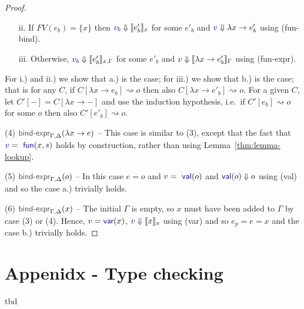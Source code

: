 \documentclass[acmsmall,anonymous,fleqn]{acmart}\settopmatter{printfolios=false,printccs=false,printacmref=false}
\theoremstyle{plain}
\theoremstyle{definition}
\newcommand{\ident}[1]{\textnormal{\textcolor{idclr}{\sffamily #1}}}
\newcommand{\bndclr}[1]{\textcolor{kvdclr}{#1}}
\newcommand{\bnd}[1]{\textnormal{\textcolor{kvdclr}{\sffamily #1}}}
\newcommand{\rname}[1]{{\sffamily\small(#1)}}
\begin{document}
\begin{proof}
\begin{enumerate}
  \item[ii.]
  If $FV(e_b)=\{x\}$ then $\bndclr{v_b}\Downarrow \llbracket e'_b \rrbracket_x$ for some $e'_b$ and
  $\bndclr{v}\Downarrow \lambda x\rightarrow e'_b$ using \rname{fun-bind}.

  \item[iii.]
  Otherwise, $\bndclr{v_b}\Downarrow \llbracket e'_b \rrbracket_{x,\Gamma}$ for some $e'_b$ and
  $\bndclr{v}\Downarrow \llbracket\lambda x\rightarrow e'_b\rrbracket_\Gamma$ using \rname{fun-expr}.
  \end{enumerate}

\noindent
For i.) and ii.) we show that a.) is the case; for iii.) we show that b.) is the case; that is
for any $C$, if $C[\lambda x\rightarrow e_b] \rightsquigarrow o$ then also
$C[\lambda x\rightarrow e'_b] \rightsquigarrow o$. For a given $C$, let $C'[-] = C[\lambda x\rightarrow -]$
and use the induction hypothesis, i.e.~if $C'[e_b] \rightsquigarrow o$ for some $o$ then also $C'[e'_b] \rightsquigarrow o$.

\vspace{0.75em}\noindent(4) $\ident{bind-expr}_{\Gamma, \Delta}(\lambda x\rightarrow e)$  --
  This case is similar to (3), except that the fact that $\bndclr{v} = \bnd{fun}(x, s)$
  holds by construction, rather than using Lemma~\ref{thm:lemma-lookup}.

\vspace{0.75em}\noindent(5) $\ident{bind-expr}_{\Gamma, \Delta}(o)$ -- In this case $e=o$ and $\bndclr{v} = \bnd{val}(o)$
  and $\bnd{val}(o)\Downarrow o$ using \rname{val} and so the case a.) trivially holds.

\vspace{0.75em}\noindent(6) $\ident{bind-expr}_{\Gamma, \Delta}(x)$ -- The initial $\Gamma$ is empty,
  so $x$ must have been added to $\Gamma$ by case (3) or (4). Hence,
  $\bndclr{v}=\bnd{var}(x)$, $\bndclr{v}\Downarrow \llbracket x \rrbracket_{x}$ using \rname{var}
  and so $e_p = e = x$ and the case b.) trivially holds.

\end{proof}

\section{Appenidx - Type checking}
\label{sec:app-types}

tbd
\end{document}

